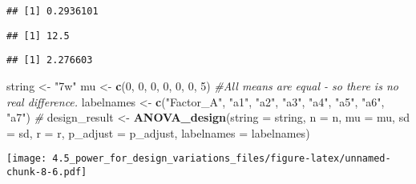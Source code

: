 \documentclass[]{article}
\newenvironment{Shaded}{\begin{snugshade}}{\end{snugshade}}
\newcommand{\KeywordTok}[1]{\textcolor[rgb]{0.13,0.29,0.53}{\textbf{#1}}}
\newcommand{\DataTypeTok}[1]{\textcolor[rgb]{0.13,0.29,0.53}{#1}}
\newcommand{\DecValTok}[1]{\textcolor[rgb]{0.00,0.00,0.81}{#1}}
\newcommand{\StringTok}[1]{\textcolor[rgb]{0.31,0.60,0.02}{#1}}
\newcommand{\CommentTok}[1]{\textcolor[rgb]{0.56,0.35,0.01}{\textit{#1}}}
\newcommand{\OperatorTok}[1]{\textcolor[rgb]{0.81,0.36,0.00}{\textbf{#1}}}
\newcommand{\NormalTok}[1]{#1}
\begin{document}
\begin{verbatim}
## [1] 0.2936101
\end{verbatim}

\begin{Shaded}
\end{Shaded}

\begin{verbatim}
## [1] 12.5
\end{verbatim}

\begin{Shaded}
\end{Shaded}

\begin{verbatim}
## [1] 2.276603
\end{verbatim}

\begin{Shaded}
\begin{Highlighting}[]
\NormalTok{string <-}\StringTok{ "7w"}
\NormalTok{mu <-}\StringTok{ }\KeywordTok{c}\NormalTok{(}\DecValTok{0}\NormalTok{, }\DecValTok{0}\NormalTok{, }\DecValTok{0}\NormalTok{, }\DecValTok{0}\NormalTok{, }\DecValTok{0}\NormalTok{, }\DecValTok{0}\NormalTok{, }\DecValTok{5}\NormalTok{) }\CommentTok{#All means are equal - so there is no real difference.}
\NormalTok{labelnames <-}\StringTok{ }\KeywordTok{c}\NormalTok{(}\StringTok{"Factor_A"}\NormalTok{, }\StringTok{"a1"}\NormalTok{, }\StringTok{"a2"}\NormalTok{, }\StringTok{"a3"}\NormalTok{, }\StringTok{"a4"}\NormalTok{, }\StringTok{"a5"}\NormalTok{, }\StringTok{"a6"}\NormalTok{, }\StringTok{"a7"}\NormalTok{) }\CommentTok{#}
\NormalTok{design_result <-}\StringTok{ }\KeywordTok{ANOVA_design}\NormalTok{(}\DataTypeTok{string =}\NormalTok{ string, }\DataTypeTok{n =}\NormalTok{ n, }\DataTypeTok{mu =}\NormalTok{ mu, }\DataTypeTok{sd =}\NormalTok{ sd, }\DataTypeTok{r =}\NormalTok{ r, }
                   \DataTypeTok{p_adjust =}\NormalTok{ p_adjust, }\DataTypeTok{labelnames =}\NormalTok{ labelnames)}
\end{Highlighting}
\end{Shaded}

\texttt{[image: 4.5\_power\_for\_design\_variations\_files/figure-latex/unnamed-chunk-8-6.pdf]}
\end{document}
